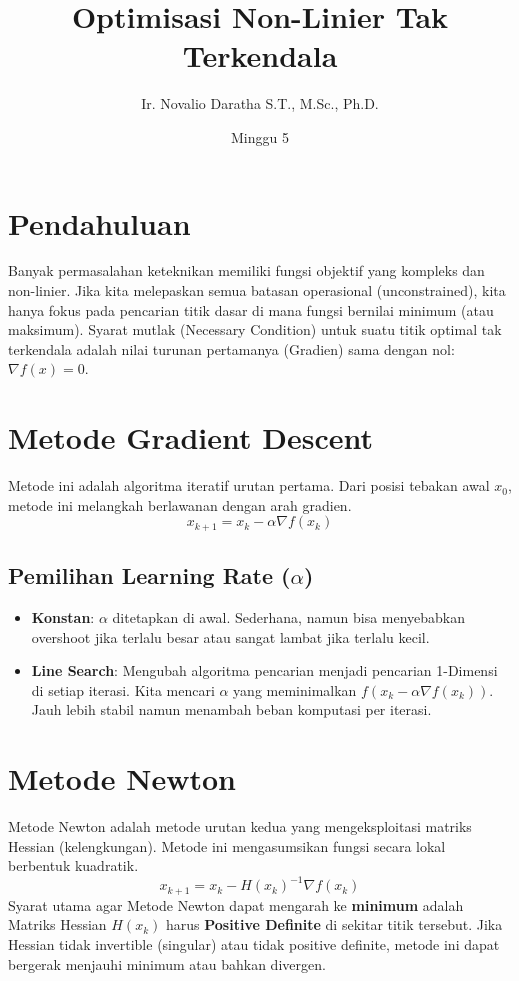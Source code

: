 \documentclass[11pt, a4paper]{article}
\title{\vspace{-1cm}\color{UNIBBlue}\textbf{Optimisasi Non-Linier Tak Terkendala}\vspace{-0.5cm}}
\author{Ir. Novalio Daratha S.T., M.Sc., Ph.D.}
\date{Minggu 5}
\begin{document}
\maketitle

\section{Pendahuluan}
Banyak permasalahan keteknikan memiliki fungsi objektif yang kompleks dan non-linier. Jika kita melepaskan semua batasan operasional (unconstrained), kita hanya fokus pada pencarian titik dasar di mana fungsi bernilai minimum (atau maksimum). Syarat mutlak (Necessary Condition) untuk suatu titik optimal tak terkendala adalah nilai turunan pertamanya (Gradien) sama dengan nol: $\nabla f(x) = 0$.

\section{Metode Gradient Descent}
Metode ini adalah algoritma iteratif urutan pertama. Dari posisi tebakan awal $x_0$, metode ini melangkah berlawanan dengan arah gradien.
\[ x_{k+1} = x_k - \alpha \nabla f(x_k) \]

\subsection{Pemilihan Learning Rate ($\alpha$)}
\begin{itemize}
    \item \textbf{Konstan}: $\alpha$ ditetapkan di awal. Sederhana, namun bisa menyebabkan overshoot jika terlalu besar atau sangat lambat jika terlalu kecil.
    \item \textbf{Line Search}: Mengubah algoritma pencarian menjadi pencarian 1-Dimensi di setiap iterasi. Kita mencari $\alpha$ yang meminimalkan $f(x_k - \alpha \nabla f(x_k))$. Jauh lebih stabil namun menambah beban komputasi per iterasi.
\end{itemize}

\section{Metode Newton}
Metode Newton adalah metode urutan kedua yang mengeksploitasi matriks Hessian (kelengkungan). Metode ini mengasumsikan fungsi secara lokal berbentuk kuadratik.
\[ x_{k+1} = x_k - H(x_k)^{-1} \nabla f(x_k) \]
Syarat utama agar Metode Newton dapat mengarah ke \textbf{minimum} adalah Matriks Hessian $H(x_k)$ harus \textbf{Positive Definite} di sekitar titik tersebut. Jika Hessian tidak invertible (singular) atau tidak positive definite, metode ini dapat bergerak menjauhi minimum atau bahkan divergen.
\end{document}
